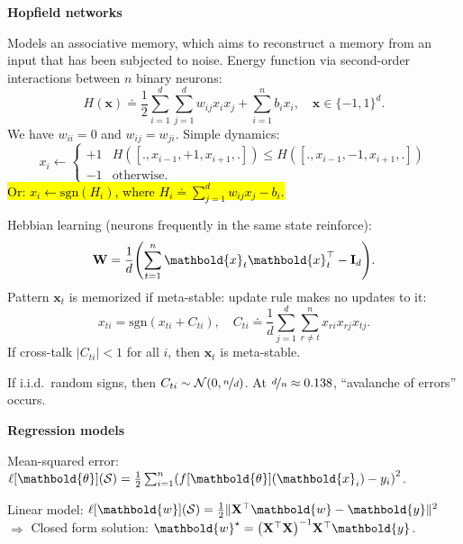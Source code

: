 \documentclass[10pt]{article}
\newenvironment{topic}[1]
{\textbf{\sffamily \footnotesize \colorbox{black}{\rlap{\textbf{\textcolor{white}{#1}}}\hspace{\linewidth}\hspace{-2\fboxsep}}}}
{}
\newenvironment{subtopic}[1]
{\begin{center}\textbf{\footnotesize \sffamily #1}\end{center}}
{}
\renewcommand{\mat}[1]{\ensuremath{\mathbf{#1}}}
\renewcommand{\vec}[1]{\ensuremath{\mathbold{#1}}}
\begin{document}
\begin{multicols*}{3}
\begin{topic}{Connectionism}
        \begin{subtopic}{Hopfield networks}
            Models an associative memory, which aims to reconstruct a memory from an input that has been subjected to noise. Energy function via second-order interactions between $n$ binary neurons: \[
                H(\vec{x}) \doteq \frac{1}{2} \sum_{i=1}^{d} \sum_{j=1}^{d} w_{ij}x_ix_j + \sum_{i=1}^{n} b_ix_i, \quad \vec{x} \in \{ -1, 1 \}^d.
            \]
            We have $w_{ii} = 0$ and $w_{ij} = w_{ji}$. Simple dynamics: \[
                x_i \gets \begin{cases}
                    +1 & H([., x_{i-1}, +1, x_{i+1}, .]) \leq H([., x_{i-1}, -1, x_{i+1}, .]) \\
                    -1 & \mathrm{otherwise}.
                \end{cases}
            \]
            \hl{Or: $x_i \gets \mathrm{sgn}(H_i)$, where $H_i \doteq \sum_{j=1}^{d} w_{ij} x_j - b_i$.}

            Hebbian learning (neurons frequently in the same state reinforce): \[
                \mat{W} = \frac{1}{d} \lft( \sum_{t=1}^{n} \vec{x}_t \transpose{\vec{x}_t} - \mat{I}_d \rgt).
            \]
            Pattern $\vec{x}_t$ is memorized if meta-stable: update rule makes no updates to it: \[
                x_{ti} = \mathrm{sgn}(x_{ti} + C_{ti}), \quad C_{ti} \doteq \frac{1}{d} \sum_{j=1}^{d} \sum_{r\neq t}^{n} x_{ri}x_{rj}x_{tj}.
            \]
            If cross-talk $|C_{ti}| < 1$ for all $i$, then $\vec{x}_t$ is meta-stable.

            If i.i.d.\ random signs, then $C_{ti} \sim \mathcal{N}(0, \nicefrac{n}{d})$. At
            $\nicefrac{d}{n} \approx 0.138$, ``avalanche of errors'' occurs.
        \end{subtopic}

    \end{topic}

    \begin{topic}{Feedforward networks}

        \begin{subtopic}{Regression models}
            Mean-squared error: $\ell[\vec{\theta}](\mathcal{S}) = \frac{1}{2} \sum_{i=1}^{n} \lft( f[\vec{\theta}](\vec{x}_i) - y_i \rgt)^2$.

            Linear model: $\ell[\vec{w}](\mathcal{S}) = \frac{1}{2} \| \transpose{\mat{X}} \vec{w} - \vec{y}
                \|^2$ $\Rightarrow$ Closed form solution: $\vec{w}^\star = \inv{\lft( \transpose{\mat{X}}\mat{X}
                    \rgt)}\transpose{\mat{X}} \vec{y}$.


\end{subtopic}
\end{topic}
\end{multicols*}
\end{document}
